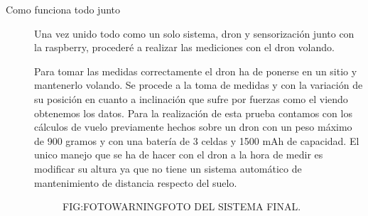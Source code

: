 \begin{description}
\item[Como funciona todo junto]

Una vez unido todo como un solo sistema, dron y sensorización junto con la raspberry, procederé a realizar las mediciones con el dron volando.

Para tomar las medidas correctamente el dron ha de ponerse en un sitio y mantenerlo volando. Se procede a la toma de medidas y con la variación de su posición en cuanto a inclinación que sufre por fuerzas como el viendo obtenemos los datos.
Para la realización de esta prueba contamos con los cálculos de vuelo previamente hechos sobre un dron con un peso máximo de 900 gramos y con una batería de 3 celdas y 1500 mAh de capacidad. El unico manejo que se ha de hacer con el dron a la hora de medir es modificar su altura ya que no tiene un sistema automático de mantenimiento de distancia respecto del suelo.

  \begin{figure}{FIG:FOTOWARNING}{FOTO DEL SISTEMA FINAL.}
\end{figure}


\end{description}

